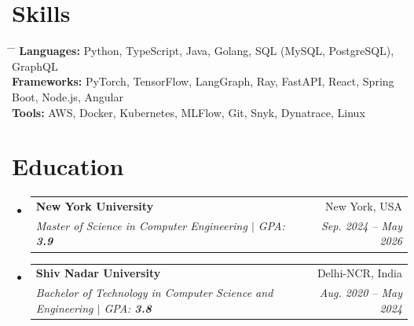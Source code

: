 \documentclass[letterpaper,11pt]{article}
\makeatletter
\newcommand{\resumeSubheading}[4]{
  \vspace{-2pt}\item
    \begin{tabular*}{0.97\textwidth}[t]{l@{\extracolsep{\fill}}r}
      \textbf{#1} & #2 \\
      \textit{\small#3} & \textit{\small #4} \\
    \end{tabular*}\vspace{-6pt}
}
\newcommand{\resumeSubHeadingListStart}{\begin{itemize}[leftmargin=0.15in, label={}]}
\newcommand{\resumeSubHeadingListEnd}{\end{itemize}}
\makeatother
\begin{document}

\section{Skills}
\begin{itemize}[leftmargin=0.15in, label={}]
    \small{\item{
        \begin{tabbing}
        \hspace{2.5cm} \= \hspace{5cm} \= \kill %
        \textbf{Languages:} \> Python, TypeScript, Java, Golang, SQL (MySQL, PostgreSQL), GraphQL\\
        \textbf{Frameworks:} \> PyTorch, TensorFlow, LangGraph, Ray, FastAPI, React, Spring Boot, Node.js, Angular \\
        \textbf{Tools:} \> AWS, Docker, Kubernetes, MLFlow, Git, Snyk, Dynatrace, Linux
        \end{tabbing}
    }}
\end{itemize}


\section{Education}
  \resumeSubHeadingListStart
    \resumeSubheading
      {New York University}{New York, USA}
      {Master of Science in Computer Engineering $|$ GPA: \textbf{3.9}}{Sep. 2024 -- May 2026}
    \resumeSubheading
      {Shiv Nadar University}{Delhi-NCR, India}
      {Bachelor of Technology in Computer Science and Engineering $|$ GPA: \textbf{3.8}}{Aug. 2020 -- May 2024}

  \resumeSubHeadingListEnd
\end{document}
